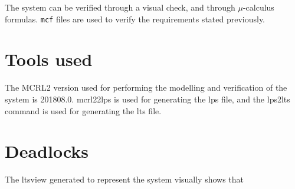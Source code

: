 The system can be verified through a visual check, and through $\mu$-calculus formulas. \texttt{mcf} files are used to verify the requirements stated previously.

\section{Tools used}

The MCRL2 version used for performing the modelling and verification of the system is 201808.0. mcrl22lps is used for generating the lps file, and the lps2lts command is used for generating the lts file.

\section{Deadlocks}

The ltsview generated to represent the system visually shows that   